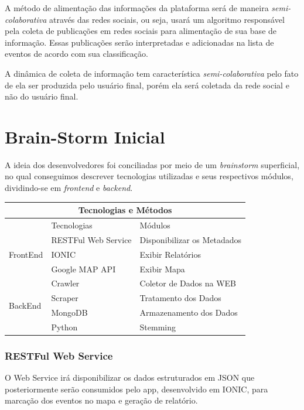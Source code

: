 \documentclass[
	12pt,				%
	openright,			%
	twoside,			%
	a4paper,			%
	english,			%
	french,				%
	spanish,			%
	brazil,				%
	]{abntex2}
\begin{document}
A método de alimentação das informações da plataforma será de maneira \textit{semi-colaborativa} através das redes sociais, ou seja, usará um algoritmo responsável pela coleta de publicações em redes sociais para alimentação de sua base de informação. Essas publicações serão interpretadas e adicionadas na lista de eventos de acordo com sua classificação.

A dinâmica de coleta de informação tem característica \textit{semi-colaborativa} pelo fato de ela ser produzida pelo usuário final, porém ela será coletada da rede social e não do usuário final.



\chapter{Brain-Storm Inicial}


A ideia dos desenvolvedores foi conciliadas por meio de um \textit{brainstorm} superficial, no qual conseguimos descrever tecnologias utilizadas e seus respectivos módulos, dividindo-se em \textit{frontend} e \textit{backend}.

\begin{center}
	\begin{tabular}{|l|l|l|}
		\hline
		\multicolumn{3}{|c|}{Tecnologias e Métodos} \\
		\hline
				 						& Tecnologias			& Módulos \\ \hline
		\multirow{3}{*}{FrontEnd} 		& RESTFul Web Service	& Disponibilizar os Metadados \\
										& IONIC 				& Exibir Relatórios\\
										& Google MAP API 		& Exibir Mapa\\ \hline
		\multirow{4}{*}{BackEnd}		& Crawler 				& Coletor de Dados na WEB\\
										& Scraper 				& Tratamento dos Dados \\
										& MongoDB 				& Armazenamento dos Dados \\
				 						& Python 				& Stemming \\ \hline
	\end{tabular}
\end{center}


\subsection*{RESTFul Web Service}

O Web Service irá disponibilizar os dados estruturados em JSON que posteriormente serão consumidos pelo app, desenvolvido em IONIC, para marcação dos eventos no mapa e geração de relatório.
\end{document}

